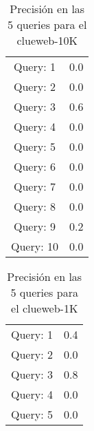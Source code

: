 \begin{table}[hbtp]
\centering
\begin{tabular}{cc}
Query: 1&0.0
\\
Query: 2&0.0
\\
Query: 3&0.6
\\
Query: 4&0.0
\\
Query: 5&0.0
\\
Query: 6&0.0
\\
Query: 7&0.0
\\
Query: 8&0.0
\\
Query: 9&0.2
\\
Query: 10&0.0
\\
\end{tabular}
\caption{Precisi\'{o}n en las 5 queries para el clueweb-10K}
\end{table}
\begin{table}[hbtp]
\centering
\begin{tabular}{cc}
Query: 1&0.4
\\
Query: 2&0.0
\\
Query: 3&0.8
\\
Query: 4&0.0
\\
Query: 5&0.0
\\
\end{tabular}
\caption{Precisi\'{o}n en las 5 queries para el clueweb-1K}
\end{table}
